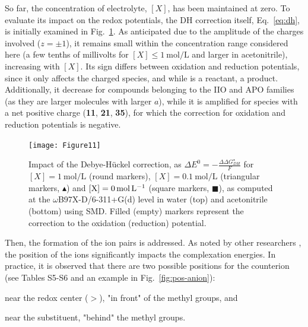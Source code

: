 \documentclass[review,preprint]{elsarticle}
\begin{document}
So far, the concentration of electrolyte, $[X]$, has been maintained at zero. To evaluate its impact on the redox potentials, the DH correction itself, Eq.~\eqref{eq:dh}, is initially examined in Fig.~\ref{fig:DH}. As anticipated due to the amplitude of the charges involved ($z=\pm 1$), it remains small within the concentration range considered here (a few tenths of millivolts for $[X] \leq \SI{1}{\mole\per\liter}$ and larger in acetonitrile), increasing with $[X]$. Its sign differs between oxidation and reduction potentials, since it only affects the charged species, and while  is a reactant,  a product. Additionally, it decrease for compounds belonging to the IIO and APO families (as they are larger molecules with larger $a$), while it is amplified for species with a net positive charge (\textbf{11}, \textbf{21}, \textbf{35}), for which the correction for oxidation and reduction potentials is negative.


\begin{figure}[!b]
	\centering
	\texttt{[image: Figure11]}
	\caption{Impact of the Debye-Hückel correction, as $\Delta E^0 = -\frac{\Delta \Delta G_{DH}^\star}{F}$ for $[X]=\SI{1}{\mole\per\liter}$ (round markers), $[X]=\SI{0.1}{\mole\per\liter}$ (triangular markers, $\blacktriangle$)  and $[\ce{X}]=\SI{0}{\mole\per\liter}$ (square markers, $\blacksquare$), as computed at the $\omega$B97X-D/6-311+G(d) level in water (top) and acetonitrile (bottom) using SMD. Filled (empty) markers represent the correction to the oxidation (reduction) potential. }
	\label{fig:DH}
\end{figure}

\clearpage

Then, the formation of the ion pairs is addressed. As noted by other researchers \cite{zhangInteractionsImidazoliumBasedIonic2016,wylieImprovedPerformanceAllOrganic2019a}, the position of the ions significantly impacts the complexation energies. In practice, it is observed that there are two possible positions for the counterion (see Tables S5-S6 and an example in Fig.~\ref{fig:pos-anion}):
\begin{inparaenum}[(i)]
	\item near the redox center ($>$), "in front" of the methyl groups, and
	\item near the substituent, "behind" the methyl groups.
\end{inparaenum}
\end{document}
